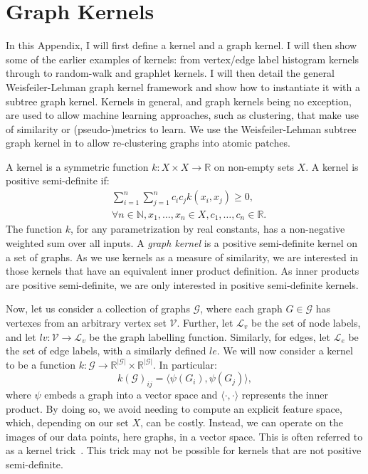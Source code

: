 \chapter{Graph Kernels}
\label{appendix:graph_kernels}

In this Appendix, I will first define a kernel and a graph kernel. I will then
show some of the earlier examples of kernels: from vertex/edge label histogram
kernels through to random-walk and graphlet kernels. I will then detail the
general Weisfeiler-Lehman graph kernel framework and show how to instantiate it
with a subtree graph kernel. Kernels in general, and graph kernels being no
exception, are used to allow machine learning approaches, such as clustering,
that make use of similarity or (pseudo-)metrics to learn. We use the
Weisfeiler-Lehman subtree graph kernel in  to allow
re-clustering \deltaPDGN graphs into atomic patches.

A kernel is a symmetric function $k: X \times X \rightarrow \mathbb{R}$ on
non-empty sets $X$. A kernel is positive semi-definite if:
\begin{align*}
	&\sum_{i=1}^{n} \sum_{j=1}^{n} c_i c_j k(x_i, x_j) \geq 0, \\
	&\forall n \in \mathbb{N}, x_1, \ldots, x_n \in X, c_1, \ldots, c_n \in \mathbb{R}. 
\end{align*}
The function $k$, for any
parametrization by real constants, has a non-negative weighted sum over all
inputs. A \emph{graph kernel} is a positive semi-definite kernel on a set of
graphs. As we use kernels as a measure of similarity, we are interested in those
kernels that have an equivalent inner product definition. As inner products are
positive semi-definite, we are only interested in positive semi-definite
kernels.

Now, let us consider a collection of graphs $\mathcal{G}$, where each graph $G
\in \mathcal{G}$ has vertexes from an arbitrary vertex set $\mathcal{V}$.
Further, let $\mathcal{L}_v$ be the set of node labels, and let $lv:
\mathcal{V} \rightarrow \mathcal{L}_v$ be the graph labelling function.
Similarly, for edges, let $\mathcal{L}_e$ be the set of edge labels, with a
similarly defined $le$. We will now consider a kernel to be a function
$k: \mathcal{G} \rightarrow \mathbb{R}^{|\mathcal{G}|} \times
\mathbb{R}^{|\mathcal{G}|}$. In particular:
\begin{equation}
\label{eq:kernel_general}
    k(\mathcal{G})_{ij} = \langle\psi(G_i), \psi(G_j)\rangle,
\end{equation}
%
where $\psi$ embeds a graph into a vector space and $\langle\cdot,\cdot\rangle$
represents the inner product. By doing so, we avoid needing to compute an
explicit feature space, which, depending on our set $X$, can be costly. Instead,
we can operate on the images of our data points, here graphs, in a vector
space. This is often referred to as a kernel trick~\cite{theodoridis2008}. This
trick may not be possible for kernels that are not positive semi-definite.

